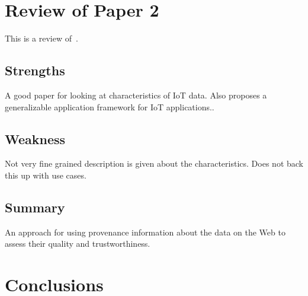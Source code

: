\documentclass[11pt,twocolumn,a4paper]{article}
\begin{document}
\section{Review of Paper 2}

This is a review of~\cite{qin:2016}.



\subsection{Strengths}
A good paper for looking at characteristics of IoT data. Also proposes a generalizable application framework for IoT applications..
\subsection{Weakness}
Not very fine grained description is given about the characteristics. Does not back this up with use cases.
\subsection{Summary}
An approach for using provenance information about the data on the Web to assess their quality and trustworthiness.


\section{Conclusions}






\end{document}
